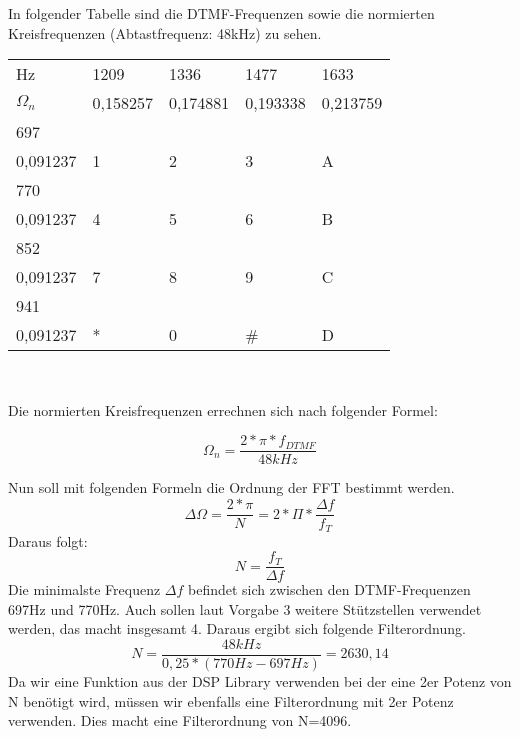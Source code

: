 In folgender Tabelle sind die DTMF-Frequenzen sowie die normierten Kreisfrequenzen (Abtastfrequenz: 48kHz) zu sehen.\\

\begin{table}[H]
	
\centering
\begin{tabular}{l|l|l|l|l}
	Hz & 1209 & 1336 & 1477 & 1633 \\
	\begin{math}\Omega_n\end{math}  & 0,158257 & 0,174881 & 0,193338 & 0,213759\\
	\hline\hline 
	697 & & & & \\
	0,091237 & 1 & 2 & 3 & A \\
	\hline
	770 & & & & \\
	0,091237 & 4 & 5 & 6 & B \\
	\hline
	852 & & & & \\
	0,091237 & 7 & 8 & 9 & C \\
	\hline
	941 & & & & \\
	0,091237 & * & 0 & \# & D \\
	\hline
\end{tabular}\\
\end{table}

Die normierten Kreisfrequenzen errechnen sich nach folgender Formel:


\begin{equation}
  \Omega_n=\frac{2*\pi*f_{DTMF}}{48kHz}
\end{equation}

Nun soll mit folgenden Formeln die Ordnung der FFT bestimmt werden. 
\begin{equation}
  \Delta\Omega=\frac{2*\pi}{N}=2*\Pi*\frac{\Delta f}{f_T}
\end{equation}
Daraus folgt:
\begin{equation}
  N=\frac{f_T}{\Delta f}
\end{equation}
Die minimalste Frequenz \begin{math}\Delta f\end{math} befindet sich zwischen den DTMF-Frequenzen 697Hz und 770Hz.
Auch sollen laut Vorgabe 3 weitere St\"utzstellen verwendet werden, das macht insgesamt 4.
Daraus ergibt sich folgende Filterordnung.
\begin{equation}
  N=\frac{48kHz}{0,25*(770Hz-697Hz)}=2630,14
\end{equation}
Da wir eine Funktion aus der DSP Library verwenden bei der eine 2er Potenz von N ben\"otigt wird, m\"ussen wir ebenfalls eine Filterordnung mit 2er Potenz verwenden.
Dies macht eine Filterordnung von N=4096.